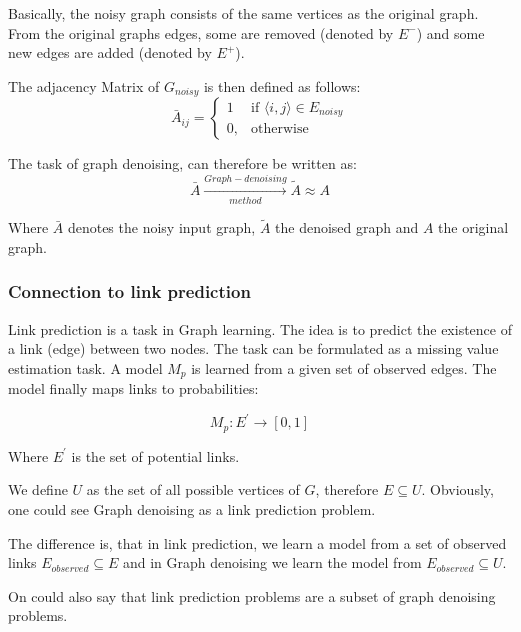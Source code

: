 Basically, the noisy graph consists of the same vertices as the original graph. From
the original graphs edges, some are removed (denoted by $E^{-}$) and some new edges are added
(denoted by $E^{+}$).

The adjacency Matrix of $G_{noisy}$ is then defined as follows:
\begin{equation}
    \bar{A}_{ij} =    
    \begin{cases}
        1  & \text{if } \langle i,j \rangle \in E_{noisy} \\
        0, & \text{otherwise}
    \end{cases}
\end{equation}

The task of graph denoising, can therefore be written as:
\begin{equation}
    \bar{A} \xrightarrow[method]{Graph-denoising} \tilde{A} \approx A
\end{equation}

Where $\bar{A}$ denotes the noisy input graph, $\tilde{A}$ the denoised
 graph and $A$ the original graph.


\subsubsection{Connection to link prediction}
Link prediction is a task in Graph learning. 
The idea is to predict the existence of a link (edge) between two nodes.
The task can be formulated as a missing value estimation task. A model $M_p$ is learned
from a given set of observed edges. The model finally maps links to probabilities:


\begin{equation}
    M_p : E^{\prime} \rightarrow [0,1]
\end{equation}

Where $E^{\prime}$ is the set of potential links.


We define $U$ as the set of all possible vertices of $G$, therefore $E \subseteq U$.
Obviously, one could see Graph denoising as a link prediction problem.

The difference is, that in link prediction, we learn a model from a set of observed links 
$E_{observed} \subseteq E$ and in Graph denoising we learn the model from 
$E_{observed} \subseteq U$. 

On could also say that link prediction problems are a subset of graph denoising problems.


